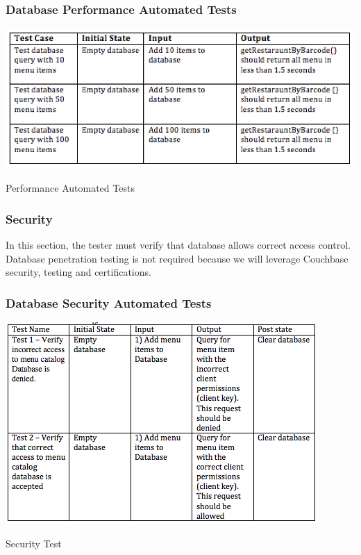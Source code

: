 \documentclass[12pt]{article}
\begin{document}
\subsubsection{Database Performance Automated Tests }
\begin{table}[h]
\includegraphics[width=\textwidth,height=\textheight,keepaspectratio]{performance_tests.png}
  \caption{Performance Automated Tests}
\end{table}

\subsubsection{Security}
In this section, the tester must verify that database allows correct access control. Database penetration testing is not required because we will leverage Couchbase security, testing and certifications.
\subsubsection{Database Security Automated Tests }
\break
\begin{table}[h]
\includegraphics[width=\textwidth,height=\textheight,keepaspectratio]{security_tests.png}
  \caption{Security Test}
\end{table}
\end{document}
